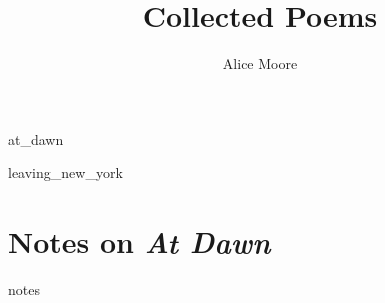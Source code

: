 \documentclass[statementpaper, twoside,openright, final]{memoir}
\title{Collected Poems}
\author{Alice Moore}
\date{}
\begin{document}
\setlength\epigraphwidth{5cm}
\setlength\epigraphrule{0pt}
\epigraphfontsize{\footnotesize}

\setlength\vgap{2.5em}

\renewcommand*{\beforepartskip}{\null\vskip 0pt plus 0.3fil}
\PlainPoemTitle

\pagestyle{simple}

\frontmatter

\begin{titlingpage}
\maketitle
\end{titlingpage}

\let\tocheadstart\relax
\tableofcontents*


\mainmatter

{at_dawn}

{leaving_new_york}


\renewcommand{\poemtoc}{chapter}
\renewcommand\appendixname{Notes}

\appendix

\chapter{Notes on \textit{At Dawn}}
{notes}
\end{document}

